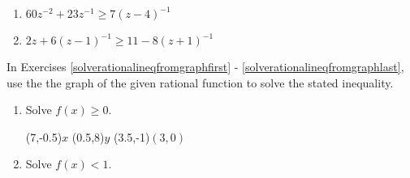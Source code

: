 \begin{multicols}{2}
\begin{enumerate}
\setcounter{enumi}{\value{HW}}

\item $60z^{-2}+23z^{-1} \geq 7(z-4)^{-1}$
\item $2z+6(z-1)^{-1} \geq 11 - 8(z+1)^{-1}$ \label{ratlineqexerciselast}

\setcounter{HW}{\value{enumi}}
\end{enumerate}
\end{multicols}

In Exercises \ref{solverationalineqfromgraphfirst} - \ref{solverationalineqfromgraphlast}, use the the graph of the given rational function to  solve the stated inequality.

\begin{multicols}{2}
\begin{enumerate}
\setcounter{enumi}{\value{HW}}

\item \label{solverationalineqfromgraphfirst} Solve $f(x) \geq 0$.


\begin{mfpic}[10]{-7}{7}{-6}{8}
\dashed {}
\tlabel[cc](7,-0.5){\scriptsize $x$}
\tlabel[cc](0.5,8){\scriptsize $y$}
\tlabel[cc](3.5,-1){\scriptsize $(3,0)$}
\axes
{}
\tiny
\tlpointsep{4pt}
\normalsize
\penwd{1.25pt}
\arrow \reverse \arrow {}
\arrow \reverse \arrow  {}
\end{mfpic}

\vfill

\columnbreak

\item  Solve $f(x) < 1$.



\end{enumerate}
\end{multicols}

